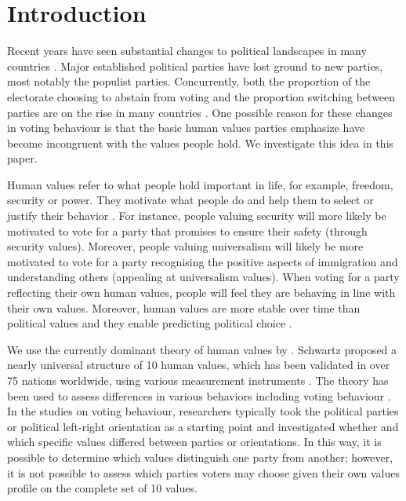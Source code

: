 \documentclass[12pt,letter]{article}\usepackage[]{graphicx}\usepackage[]{xcolor}
\begin{document}
\newpage
\section*{Introduction}
\doublespace
Recent years have seen substantial changes to political landscapes in many countries \citep{meer2015}. Major established political parties  have lost ground to new parties, most notably the populist parties. Concurrently, both the proportion of the electorate choosing to abstain from voting and the proportion switching between parties are on the rise in many countries \citep[e.g.,][]{eurostat}. One possible reason for these changes in voting behaviour is that the basic human values parties emphasize have become incongruent with the values people hold. We investigate this idea in this paper.

Human values refer to what people hold important in life, for example, freedom, security or power. They motivate what people do and help them to select or justify their behavior \citep{schwartz1992}. For instance, people valuing security will more likely be motivated to vote for a party that promises to ensure their safety (through security values). Moreover, people valuing universalism will likely be  more motivated to vote for a party recognising the positive aspects of immigration and understanding others (appealing at universalism values). When voting for a party reflecting their own human values, people will feel they are behaving in line with their own values. Moreover, human values are more stable over time than political values \citep{vecchione2013} and they enable predicting political choice \citep[e.g.,][]{caprara2006}.

We use the currently dominant theory of human values by \citep{schwartz1992, schwartz2012}. Schwartz proposed a nearly universal structure of 10 human values, which has been validated in over 75 nations worldwide, using various measurement instruments \citep{cieciuch2013}. The theory has been used to assess differences in various behaviors including voting behaviour \citep{schwartz2015}. In the studies on voting behaviour, researchers typically took the political parties or political left-right orientation as a starting point and investigated whether and which specific values differed between parties or orientations. In this way, it is possible to determine which values distinguish one party from another; however, it is not possible to assess which parties voters may choose given their own values profile on the complete set of 10 values.
\end{document}
